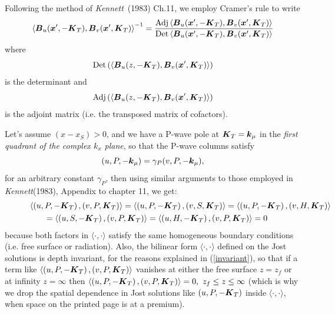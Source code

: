 Following the method of {\em Kennett\/}~(1983) Ch.11, we employ Cramer's 
rule to write 
\begin{equation}  \label{InvCond}
\left\langle{\mbox{\boldmath$\mit B$\unboldmath}}_{u}({\mbox{\boldmath$\mit x$\unboldmath}}^{\prime},-{\mbox{\boldmath$\mit K$\unboldmath}}_{T}),{\mbox{\boldmath$\mit B$\unboldmath}}_{v}({\mbox{\boldmath$\mit x$\unboldmath}}^{\prime},{\mbox{\boldmath$\mit K$\unboldmath}}_{T})\right\rangle^{-1}=\frac{
\mbox{Adj} \left\langle{\mbox{\boldmath$\mit B$\unboldmath}}_{u}({\mbox{\boldmath$\mit x$\unboldmath}}^{\prime},-{\mbox{\boldmath$\mit K$\unboldmath}}_{T}),{\mbox{\boldmath$\mit B$\unboldmath}}_{v}({\mbox{\boldmath$\mit x$\unboldmath}}^{\prime},{\mbox{\boldmath$\mit K$\unboldmath}}_{T})\right\rangle }{\mbox{Det}\left\langle{\mbox{\boldmath$\mit B$\unboldmath}}_{u}({\mbox{\boldmath$\mit x$\unboldmath}}^{\prime},-{\mbox{\boldmath$\mit K$\unboldmath}}_{T}),{\mbox{\boldmath$\mit B$\unboldmath}}_{v}({\mbox{\boldmath$\mit x$\unboldmath}}^{\prime},{\mbox{\boldmath$\mit K$\unboldmath}}_{T})\right\rangle}
\end{equation}
where 
\[
\mbox{Det}\left(\left\langle{\mbox{\boldmath$\mit B$\unboldmath}}_{u}(z,-{\mbox{\boldmath$\mit K$\unboldmath}}_{T}),
{\mbox{\boldmath$\mit B$\unboldmath}}_{v}({\mbox{\boldmath$\mit x$\unboldmath}}^{\prime},{\mbox{\boldmath$\mit K$\unboldmath}}_{T})\right\rangle\right)
\]
is the determinant and 
\[
\mbox{Adj}\left(\left\langle{\mbox{\boldmath$\mit B$\unboldmath}}_{u}(z,-{\mbox{\boldmath$\mit K$\unboldmath}}_{T}),
{\mbox{\boldmath$\mit B$\unboldmath}}_{v}({\mbox{\boldmath$\mit x$\unboldmath}}^{\prime},{\mbox{\boldmath$\mit K$\unboldmath}}_{T})\right\rangle\right)
\]
is the adjoint matrix (i.e. the transposed matrix of cofactors).


Let's assume $(x-x_S)>0$, and we have a P-wave pole at 
${\mbox{\boldmath$\mit K$\unboldmath}}_{T}={\mbox{\boldmath$\mit k$\unboldmath}}_{\mu}$ in the 
{\em first quadrant of the complex $k_x$ plane\/}, 
so that the P-wave columns satisfy 
\[
(u,P,-{\mbox{\boldmath$\mit k$\unboldmath}}_{\mu})=\gamma_{P} (v,P,-{\mbox{\boldmath$\mit k$\unboldmath}}_{\mu}),
\]
 for an arbitrary constant 
$\gamma_{P}$, then using similar arguments to those employed in {\em 
Kennett\/}(1983),  Appendix to chapter 11, we get:
\begin{eqnarray} \label{zeroinv}
\lefteqn{
\!\!\!\!\!\!
\left\langle{\left({u,P,-{\bmi K}_{T}}\right),\left({v,P,{\bmi K}_{T}}\right)}\right\rangle=
\left\langle{\left({u,P,-{\bmi K}_{T}}\right),\left({v,S,{\bmi K}_{T}}\right)}\right\rangle=
\left\langle{\left({u,P,-{\bmi K}_{T}}\right),\left({v,H,{\bmi 
K}_{T}}\right)}\right\rangle}\nonumber\\
&&
=\left\langle{\left({u,S,-{\bmi K}_{T}}\right),\left({v,P,{\bmi K}_{T}}\right)}\right\rangle=
\left\langle{\left({u,H,-{\bmi K}_{T}}\right),\left({v,P,{\bmi 
K}_{T}}\right)}\right\rangle=0
\end{eqnarray}
because both factors in $\langle \cdot, \cdot \rangle$ satisfy the same 
homogeneous boundary conditions (i.e. free surface or radiation). Also, 
the bilinear form  $\langle \cdot, \cdot \rangle$ defined on the Jost 
solutions is depth invariant, for the reasons explained in (\ref{invariant}), so 
that if a term like $\left\langle{\left({u,P,-{\mbox{\boldmath$\mit K$\unboldmath}}_{T}}\right),\left({v,P,{\mbox{\boldmath$\mit K$\unboldmath}}_{T}}\right)}\right\rangle$ vanishes at either the free surface $z=z_f$ 
or at infinity $z=\infty$ then $\left\langle{\left({u,P,-{\mbox{\boldmath$\mit K$\unboldmath}}_{T}}\right),\left({v,P,{\mbox{\boldmath$\mit K$\unboldmath}}_{T}}\right)}\right\rangle=0, \ z_f \le z \le \infty$ (which is why we 
drop the spatial dependence in Jost solutions like $\left({u,P,-{\mbox{\boldmath$\mit K$\unboldmath}}_{T}}\right)$ inside $\langle \cdot, \cdot \rangle$, 
when space on the printed page is at a premium). 


